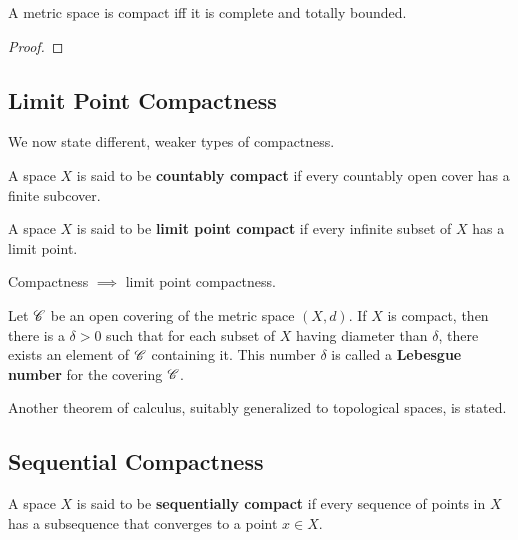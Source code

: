   \begin{theorem}
    A metric space is compact iff it is complete and totally bounded. 
  \end{theorem}
  \begin{proof}
    
  \end{proof}

\subsection{Limit Point Compactness}

  We now state different, weaker types of compactness. 

  \begin{definition}
    A space $X$ is said to be \textbf{countably compact} if every countably open cover has a finite subcover. 
  \end{definition}

  \begin{definition}
    A space $X$ is said to be \textbf{limit point compact} if every infinite subset of $X$ has a limit point. 
  \end{definition}

  \begin{theorem}
    Compactness $\implies$ limit point compactness.  
  \end{theorem}

  \begin{lemma}
    Let $\operatorname{\mathscr{C}}$ be an open covering of the metric space $(X, d)$. If $X$ is compact, then there is a $\delta > 0$ such that for each subset of $X$ having diameter than $\delta$, there exists an element of $\operatorname{\mathscr{C}}$ containing it. This number $\delta$ is called a \textbf{Lebesgue number} for the covering $\operatorname{\mathscr{C}}$. 
  \end{lemma}

  Another theorem of calculus, suitably generalized to topological spaces, is stated. 

\subsection{Sequential Compactness}

  \begin{definition}
    A space $X$ is said to be \textbf{sequentially compact} if every sequence of points in $X$ has a subsequence that converges to a point $x \in X$. 
  \end{definition}

